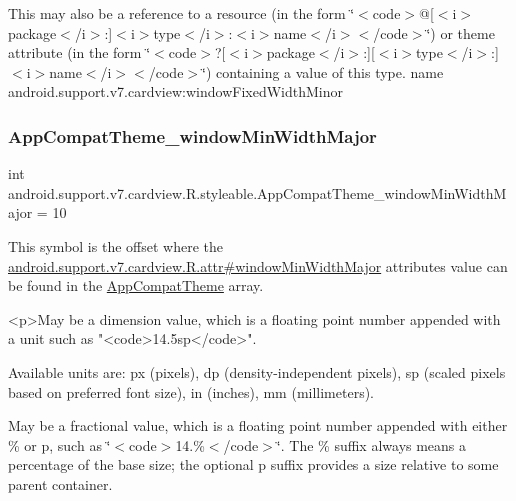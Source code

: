 This may also be a reference to a resource (in the form \char`\"{}$<$code$>$@\mbox{[}$<$i$>$package$<$/i$>$\+:\mbox{]}$<$i$>$type$<$/i$>$\+:$<$i$>$name$<$/i$>$$<$/code$>$\char`\"{}) or theme attribute (in the form \char`\"{}$<$code$>$?\mbox{[}$<$i$>$package$<$/i$>$\+:\mbox{]}\mbox{[}$<$i$>$type$<$/i$>$\+:\mbox{]}$<$i$>$name$<$/i$>$$<$/code$>$\char`\"{}) containing a value of this type.  name android.\+support.\+v7.\+cardview\+:window\+Fixed\+Width\+Minor \mbox{\label{classandroid_1_1support_1_1v7_1_1cardview_1_1R_1_1styleable_a3d9fe7753815eb3cf40acf6790e1dd68}} 
\subsubsection{\texorpdfstring{App\+Compat\+Theme\+\_\+window\+Min\+Width\+Major}{AppCompatTheme\_windowMinWidthMajor}}
{\footnotesize\ttfamily int android.\+support.\+v7.\+cardview.\+R.\+styleable.\+App\+Compat\+Theme\+\_\+window\+Min\+Width\+Major = 10\hspace{0.3cm}{\ttfamily [static]}}

This symbol is the offset where the \hyperlink{classandroid_1_1support_1_1v7_1_1cardview_1_1R_1_1attr_a2ecfc1a56d5e9664224bb3d917db75b6}{android.\+support.\+v7.\+cardview.\+R.\+attr\#window\+Min\+Width\+Major} attribute\textquotesingle{}s value can be found in the \hyperlink{classandroid_1_1support_1_1v7_1_1cardview_1_1R_1_1styleable_a52e6f69f954ecc2622d72c0b4d298938}{App\+Compat\+Theme} array.

\begin{DoxyVerb}      <p>May be a dimension value, which is a floating point number appended with a unit such as "<code>14.5sp</code>".
\end{DoxyVerb}
 Available units are\+: px (pixels), dp (density-\/independent pixels), sp (scaled pixels based on preferred font size), in (inches), mm (millimeters). 

May be a fractional value, which is a floating point number appended with either \% or p, such as \char`\"{}$<$code$>$14.\%$<$/code$>$\char`\"{}. The \% suffix always means a percentage of the base size; the optional p suffix provides a size relative to some parent container. 


